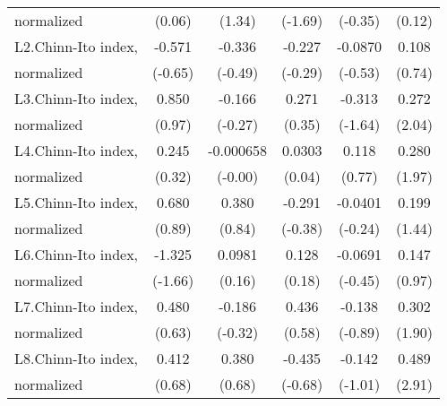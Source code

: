{\begin{tabular}{l*{5}{c}}
normalized          &      (0.06)         &      (1.34)         &     (-1.69)         &     (-0.35)         &      (0.12)         \\
[1em]
L2.Chinn-Ito index, &      -0.571         &      -0.336         &      -0.227         &     -0.0870         &       0.108         \\
normalized          &     (-0.65)         &     (-0.49)         &     (-0.29)         &     (-0.53)         &      (0.74)         \\
[1em]
L3.Chinn-Ito index, &       0.850         &      -0.166         &       0.271         &      -0.313         &       0.272\sym{*}  \\
normalized          &      (0.97)         &     (-0.27)         &      (0.35)         &     (-1.64)         &      (2.04)         \\
[1em]
L4.Chinn-Ito index, &       0.245         &   -0.000658         &      0.0303         &       0.118         &       0.280         \\
normalized          &      (0.32)         &     (-0.00)         &      (0.04)         &      (0.77)         &      (1.97)         \\
[1em]
L5.Chinn-Ito index, &       0.680         &       0.380         &      -0.291         &     -0.0401         &       0.199         \\
normalized          &      (0.89)         &      (0.84)         &     (-0.38)         &     (-0.24)         &      (1.44)         \\
[1em]
L6.Chinn-Ito index, &      -1.325         &      0.0981         &       0.128         &     -0.0691         &       0.147         \\
normalized          &     (-1.66)         &      (0.16)         &      (0.18)         &     (-0.45)         &      (0.97)         \\
[1em]
L7.Chinn-Ito index, &       0.480         &      -0.186         &       0.436         &      -0.138         &       0.302         \\
normalized          &      (0.63)         &     (-0.32)         &      (0.58)         &     (-0.89)         &      (1.90)         \\
[1em]
L8.Chinn-Ito index, &       0.412         &       0.380         &      -0.435         &      -0.142         &       0.489\sym{**} \\
normalized          &      (0.68)         &      (0.68)         &     (-0.68)         &     (-1.01)         &      (2.91)         \\

\end{tabular}}
